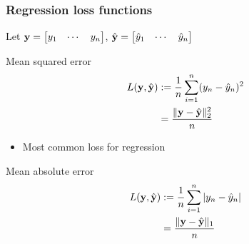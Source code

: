 \begin{frame}
    \frametitle{Regression loss functions}
    Let $\mathbf{y} = \begin{bmatrix} y_1 & \cdots & y_n \end{bmatrix}$,
    $\hat{\mathbf{y}} = \begin{bmatrix} \hat{y}_1 & \cdots & \hat{y}_n \end{bmatrix}$

    \begin{block}{Mean squared error}
        \vspace{-1em}
        \begin{align*}
            L(\mathbf{y}, \hat{\mathbf{y}}) &:= \frac{1}{n} \sum_{i=1}^n (y_n - \hat{y}_n)^2 \\
            &= \dfrac{\|\mathbf{y} - \hat{\mathbf{y}}\|_2^2}{n}
        \end{align*}
        \vspace{-1em}
        \begin{itemize}
            \item Most common loss for regression
        \end{itemize}
    \end{block}
    \pause

    \begin{block}{Mean absolute error}
        \vspace{-1em}
        \begin{align*}
            L(\mathbf{y}, \hat{\mathbf{y}}) &:= \frac{1}{n} \sum_{i=1}^n |y_n - \hat{y}_n| \\
            &= \dfrac{\|\mathbf{y} - \hat{\mathbf{y}}\|_1}{n}
        \end{align*}
        \vspace{-1em}
    \end{block}
\end{frame}

